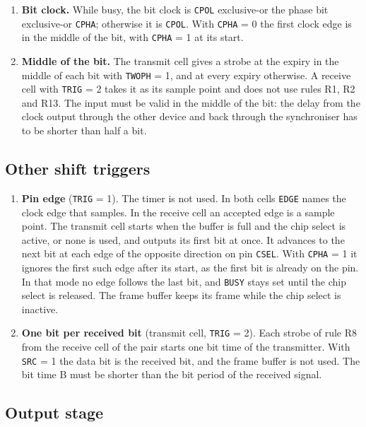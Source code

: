 \documentclass[10pt,a4paper]{article}
\newcommand{\reg}[1]{\texttt{#1}}
\begin{document}
\begin{enumerate}[label=\textbf{X\arabic*},leftmargin=2.6em]
(\reg{TRIG} = 0 only) the transmitter first holds both outputs low for two bit periods after the last bit,
\reg{BUSY} stays set during them, and a frame in the buffer starts after them.
\item \textbf{Bit clock.} While busy, the bit clock is \reg{CPOL} exclusive-or the phase bit exclusive-or \reg{CPHA}; otherwise it is \reg{CPOL}. With \reg{CPHA} = 0 the first clock edge is in the middle of the bit, with \reg{CPHA} = 1 at its start.
\item \textbf{Middle of the bit.} The transmit cell gives a strobe at the expiry in the middle of each bit with
\reg{TWOPH} = 1, and at every expiry otherwise. A receive cell with \reg{TRIG} = 2 takes it as its sample
point and does not use rules R1, R2 and R13. The input must be valid in the middle of the bit: the delay from
the clock output through the other device and back through the synchroniser has to be shorter than half a bit.
\end{enumerate}

\subsection{Other shift triggers}

\begin{enumerate}[label=\textbf{G\arabic*},leftmargin=2.6em]
\item \textbf{Pin edge} (\reg{TRIG} = 1). The timer is not used. In both cells \reg{EDGE} names the clock edge that
samples. In the receive cell an accepted edge is a sample point. The transmit cell starts when the buffer is
full and the chip select is active, or none is used, and outputs its first bit at once. It advances to the next
bit at each edge of the opposite direction on pin \reg{CSEL}. With \reg{CPHA} = 1 it ignores the first such
edge after its start, as the first bit is already on the pin. In that mode no edge follows the last bit, and
\reg{BUSY} stays set until the chip select is released. The frame buffer keeps its frame while the chip select
is inactive.
\item \textbf{One bit per received bit} (transmit cell, \reg{TRIG} = 2). Each strobe of rule R8 from the receive cell
of the pair starts one bit time of the transmitter. With \reg{SRC} = 1 the data bit is the received bit, and
the frame buffer is not used. The bit time B must be shorter than the bit period of the received signal.
\end{enumerate}

\subsection{Output stage}
\end{document}
